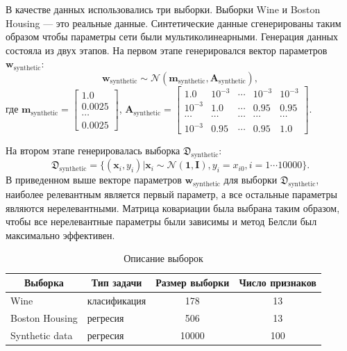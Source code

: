 В качестве данных использовались три выборки. Выборки Wine \cite{Wine} и Boston Housing \cite{Boston}  --- это реальные данные. Синтетические данные сгенерированы таким образом чтобы параметры сети были мультиколинеарными. Генерация данных состояла из двух этапов. 
На первом этапе генерировался вектор параметров $\mathbf{w}_{\text{synthetic}}$:
\[
\mathbf{w}_{\text{synthetic}}  \sim \mathcal{N}(\textbf{m}_{\text{synthetic}}, \textbf{A}_{\text{synthetic}}),
\]
где 
$\textbf{m}_{\text{synthetic}} = \begin{bmatrix}
1.0\\
0.0025\\
\cdots\\
0.0025
\end{bmatrix}$,
$\textbf{A}_{\text{synthetic}} = \begin{bmatrix}
1.0& 10^{-3}& \cdots& 10^{-3}& 10^{-3}\\
10^{-3}& 1.0& \cdots& 0.95& 0.95\\
\cdots&\cdots&\cdots&\cdots&\cdots\\
10^{-3}& 0.95& \cdots& 0.95& 1.0
\end{bmatrix}$.

На втором этапе генерировалась выборка $\mathfrak{D}_{\text{synthetic}}$:
\[
\mathfrak{D}_{\text{synthetic}} = \{(\textbf{x}_i,y_i)| \textbf{x}_i \sim  \mathcal{N}(\textbf{1}, \textbf{I}), y_i = x_{i0}, i = 1 \cdots 10000\}.
\]
В приведенном выше векторе параметров $\mathbf{w}_{\text{synthetic}}$ для выборки $\mathfrak{D}_{\text{synthetic}}$, наиболее релевантным является первый параметр, а все остальные параметры являются нерелевантными. Матрица ковариации была выбрана таким образом, чтобы все нерелевантные параметры были зависимы и метод Белсли был максимально эффективен.



\begin{table}[h]

\begin{center}
\caption{Описание выборок}
\begin{tabular}{|c|c|c|c|}
\hline
	Выборка &Тип задачи& Размер выборки& Число признаков\\
	\hline
	
	\multicolumn{1}{|l|}{Wine}
	&
	\multicolumn{1}{|l|}{класификация}
	 & 178 & 13\\
	\hline
	
	\multicolumn{1}{|l|}{Boston Housing}
	&
	\multicolumn{1}{|l|}{регресия}
	& 506 & 13\\
	\hline
	
	\multicolumn{1}{|l|}{Synthetic data}
	&
	\multicolumn{1}{|l|}{регресия}
	& 10000 & 100\\
\hline

\end{tabular}
\end{center}
\end{table}



